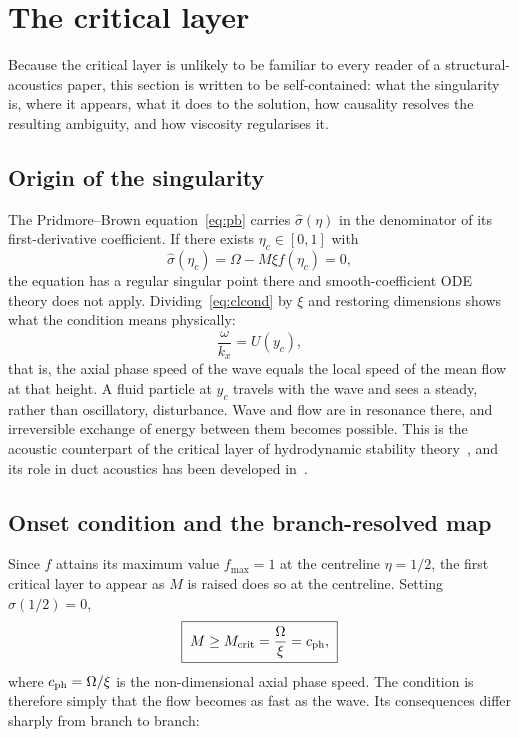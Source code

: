\documentclass[11pt,a4paper]{article}
\newcommand{\Om}{\Omega}
\newcommand{\sig}{\hat\sigma}
\theoremstyle{plain}
\theoremstyle{remark}
\begin{document}
\section{The critical layer}\label{sec:cl}

Because the critical layer is unlikely to be familiar to every reader of a structural-acoustics paper,
this section is written to be self-contained: what the singularity is, where it appears, what it does
to the solution, how causality resolves the resulting ambiguity, and how viscosity regularises it.

\subsection{Origin of the singularity}
The Pridmore--Brown equation~\eqref{eq:pb} carries $\sig(\eta)$ in the denominator of its
first-derivative coefficient. If there exists $\eta_c\in[0,1]$ with
\begin{equation}
\sig(\eta_c)=\Om-M\xi f(\eta_c)=0,
\label{eq:clcond}
\end{equation}
the equation has a regular singular point there and smooth-coefficient ODE theory does not apply.
Dividing~\eqref{eq:clcond} by $\xi$ and restoring dimensions shows what the condition means physically:
\begin{equation}
\frac{\omega}{k_x}=U(y_c),
\end{equation}
that is, the axial phase speed of the wave equals the local speed of the mean flow at that height. A
fluid particle at $y_c$ travels with the wave and sees a steady, rather than oscillatory, disturbance.
Wave and flow are in resonance there, and irreversible exchange of energy between them becomes
possible. This is the acoustic counterpart of the critical layer of hydrodynamic stability
theory~\cite{case,maslowe,drazinreid}, and its role in duct acoustics has been developed
in~\cite{brambleydarau,king2022}.

\subsection{Onset condition and the branch-resolved map}
Since $f$ attains its maximum value $f_{\max}=1$ at the centreline $\eta=1/2$, the first critical layer
to appear as $M$ is raised does so at the centreline. Setting $\sig(1/2)=0$,
\begin{equation}
\boxed{\;M\ge M_{\rm crit}=\frac{\Om}{\xi}=c_{\rm ph},\;}
\label{eq:Mcrit}
\end{equation}
where $c_{\rm ph}=\Om/\xi$ is the non-dimensional axial phase speed. The condition is therefore simply
that the flow becomes as fast as the wave. Its consequences differ sharply from branch to branch:
\end{document}
